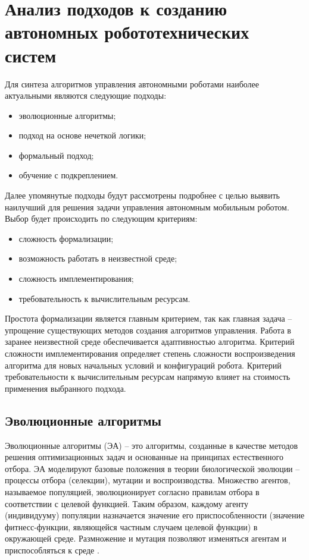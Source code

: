 \section{Анализ подходов к созданию автономных робототехнических систем} \label{literature}

Для синтеза алгоритмов управления автономными роботами наиболее актуальными являются следующие подходы:
\begin{itemize}
	\item эволюционные алгоритмы;
	\item подход на основе нечеткой логики;
	\item формальный подход;
	\item обучение с подкреплением.

\end{itemize}

Далее упомянутые подходы будут рассмотрены подробнее с целью выявить наилучший для решения задачи управления автономным мобильным роботом. 
Выбор будет происходить по следующим критериям:
\begin{itemize}
	\item сложность формализации;
	\item возможность работать в неизвестной среде;
	\item сложность имплементирования;
	\item требовательность к вычислительным ресурсам.
\end{itemize}

Простота формализации является главным критерием, так как главная задача -- упрощение существующих методов создания алгоритмов управления. 
Работа в заранее неизвестной среде обеспечивается адаптивностью алгоритма. 
Критерий сложности имплементирования определяет степень сложности воспроизведения алгоритма для новых начальных условий и конфигураций робота. 
Критерий требовательности к вычислительным ресурсам напрямую влияет на стоимость применения выбранного подхода.


\subsection{Эволюционные алгоритмы}

Эволюционные алгоритмы (ЭА) – это алгоритмы, созданные в качестве методов решения оптимизационных задач и основанные на принципах естественного отбора. 
ЭА моделируют базовые положения в теории биологической эволюции -- процессы отбора (селекции), мутации и воспроизводства. 
Множество агентов, называемое популяцией, эволюционирует согласно правилам отбора в соответствии с целевой функцией. Таким образом, каждому агенту (индивидууму) популяции назначается значение его приспособленности (значение фитнесс-функции, являющейся частным случаем целевой функции) в окружающей среде. 
Размножение и мутация позволяют изменяться агентам и приспособляться к среде \cite{evolution}.

